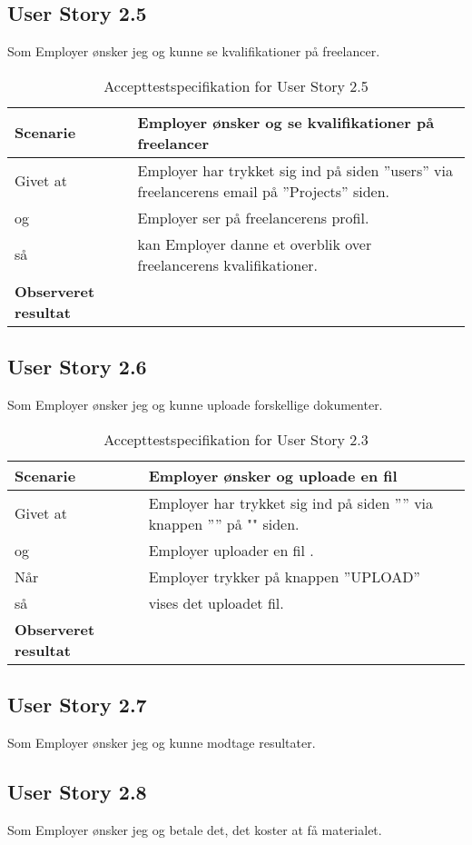 \subsection{User Story 2.5}
Som Employer ønsker jeg og kunne se kvalifikationer på freelancer.

\begin{table}[H]
	\centering
	\caption{Accepttestspecifikation for User Story 2.5 }
	\begin{tabular}{p{8cm}|p{8cm}}
		\hline
		\textbf{Scenarie} & Employer ønsker og se kvalifikationer på freelancer\\[10px]
		\hline
		Givet at & Employer har trykket sig ind på siden ''users'' via freelancerens email på ''Projects'' siden.\\
        \hline
        og & Employer ser på freelancerens profil.\\
        \hline
        så & kan Employer danne et overblik over freelancerens kvalifikationer.\\
		\hline
		\rowcolor{white}
		\textbf{Observeret resultat} & \\
		\hline
	\end{tabular}
\end{table}

\subsection{User Story 2.6}
Som Employer ønsker jeg og kunne uploade forskellige dokumenter.

\begin{table}[H]
	\centering
	\caption{Accepttestspecifikation for User Story 2.3 }
	\begin{tabular}{p{6cm}|p{6cm}}
		\hline
		\textbf{Scenarie} & Employer ønsker og uploade en fil\\[10px]
		\hline
		Givet at & Employer har trykket sig ind på siden '''' via knappen '''' på "" siden.\\
        \hline
        og & Employer uploader en fil .\\
        \hline
        Når & Employer trykker på knappen ''UPLOAD''\\
        \hline
        så & vises det uploadet fil.\\
		\hline
		\rowcolor{white}
		\textbf{Observeret resultat} & \\
		\hline
	\end{tabular}
\end{table}


\subsection{User Story 2.7}
Som Employer ønsker jeg og kunne modtage resultater.


\subsection{User Story 2.8}
Som Employer ønsker jeg og betale det, det koster at få materialet.
